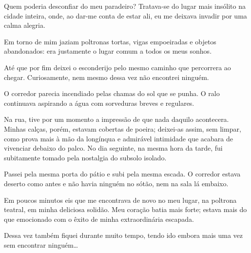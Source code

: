 Quem poderia desconfiar do meu paradeiro? Tratava-se do lugar mais insólito na
cidade inteira, onde, ao dar-me conta de estar ali, eu me deixava invadir por
uma calma alegria.

Em torno de mim jaziam poltronas tortas, vigas empoeiradas e objetos
abandonados: era justamente o lugar comum a todos os meus sonhos. 


Até que por fim deixei o esconderijo pelo mesmo caminho que percorrera ao
chegar. Curiosamente, nem mesmo dessa vez não encontrei ninguém.

O corredor parecia incendiado pelas chamas do sol que se punha. O ralo
continuava aspirando a água com sorveduras breves e regulares.

Na rua, tive por um momento a impressão de que nada daquilo acontecera. Minhas
calças, porém, estavam cobertas de poeira; deixei-as assim, sem limpar, como
prova mais à mão da longínqua e admirável intimidade que acabara de vivenciar
debaixo do palco. No dia seguinte, na mesma hora da tarde, fui subitamente
tomado pela nostalgia do subsolo isolado.


Passei pela mesma porta do pátio e subi pela mesma escada. O corredor estava
deserto como antes e não havia ninguém no sótão, nem na sala lá embaixo.

Em poucos minutos eis que me encontrava de novo no meu lugar, na poltrona
teatral, em minha deliciosa solidão. Meu coração batia mais forte; estava
mais do que emocionado com o êxito de minha extraordinária escapada.


Dessa vez também fiquei durante muito tempo, tendo ido embora mais uma vez sem
encontrar ninguém\ldots{}


